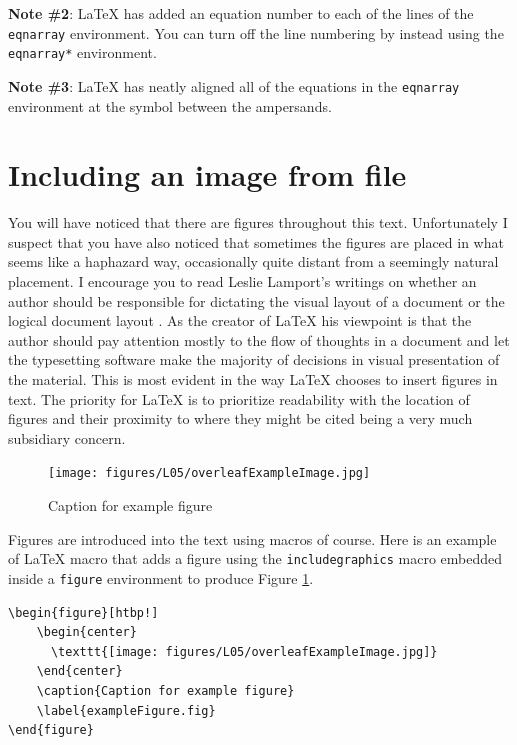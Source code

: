 {\bf Note \#2}: \LaTeX{} has added an equation number to each of the lines of the \verb|eqnarray| environment. You can turn off the line numbering by instead using the \verb|eqnarray*| environment.

{\bf Note \#3}: \LaTeX{} has neatly aligned all of the equations in the \verb|eqnarray| environment at the symbol between the ampersands.

\section{Including an image from file}

You will have noticed that there are figures throughout this text. Unfortunately I suspect that you have also noticed that sometimes the figures are placed in what seems like a haphazard way, occasionally quite distant from a seemingly natural placement. I encourage you to read Leslie Lamport's writings on whether an author should be responsible for dictating the visual layout of a document or the logical document layout \cite{lamport1988document}. As the creator of \LaTeX{} his viewpoint is that the author should pay attention mostly to the flow of thoughts in a document and let the typesetting software make the majority of decisions in visual presentation of the material. This is most evident in the way \LaTeX{} chooses to insert figures in text. The priority for \LaTeX{} is to prioritize readability with the location of figures and their proximity to where they might be cited being a very much subsidiary concern.

\begin{figure}[htbp!]
    \begin{center}
      \texttt{[image: figures/L05/overleafExampleImage.jpg]}
    \end{center}
    \caption{Caption for example figure}
    \label{exampleFigure.fig}
\end{figure}


Figures are introduced into the text using macros of course. Here is an example of \LaTeX{} macro that adds a figure using the \texttt{includegraphics} macro embedded inside a \texttt{figure} environment to produce Figure \ref{exampleFigure.fig}.

\begin{verbatim}
\begin{figure}[htbp!]
    \begin{center}
      \texttt{[image: figures/L05/overleafExampleImage.jpg]}
    \end{center}
    \caption{Caption for example figure}
    \label{exampleFigure.fig}
\end{figure}
\end{verbatim}

